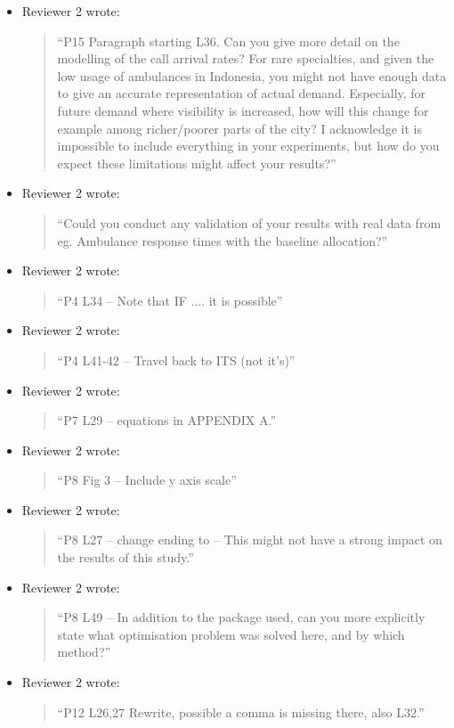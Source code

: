 \documentclass{article}
\begin{document}
\begin{itemize}
\item Reviewer 2 wrote:
\begin{quote}
``P15 Paragraph starting L36. Can you give more detail on the modelling of the call arrival rates? For rare specialties, and given the low usage of ambulances in Indonesia, you might not have enough data to give an accurate representation of actual demand. Especially, for future demand where visibility is increased, how will this change for example among richer/poorer parts of the city? I acknowledge it is impossible to include everything in your experiments, but how do you expect these limitations might affect your results?''
\end{quote}

\item Reviewer 2 wrote:
\begin{quote}
``Could you conduct any validation of your results with real data from eg. Ambulance response times with the baseline allocation?''
\end{quote}

\item Reviewer 2 wrote:
\begin{quote}
``P4 L34 – Note that IF .... it is possible''
\end{quote}

\item Reviewer 2 wrote:
\begin{quote}
``P4 L41-42 – Travel back to ITS (not it’s)''
\end{quote}

\item Reviewer 2 wrote:
\begin{quote}
``P7 L29 – equations in APPENDIX A.''
\end{quote}

\item Reviewer 2 wrote:
\begin{quote}
``P8 Fig 3 – Include y axis scale''
\end{quote}

\item Reviewer 2 wrote:
\begin{quote}
``P8 L27 – change ending to – This might not have a strong impact on the results of this study.''
\end{quote}

\item Reviewer 2 wrote:
\begin{quote}
``P8 L49 – In addition to the package used, can you more explicitly state what optimisation problem was solved here, and by which method?''
\end{quote}

\item Reviewer 2 wrote:
\begin{quote}
``P12 L26,27 Rewrite, possible a comma is missing there, also L32.''
\end{quote}

\end{itemize}
\end{document}
